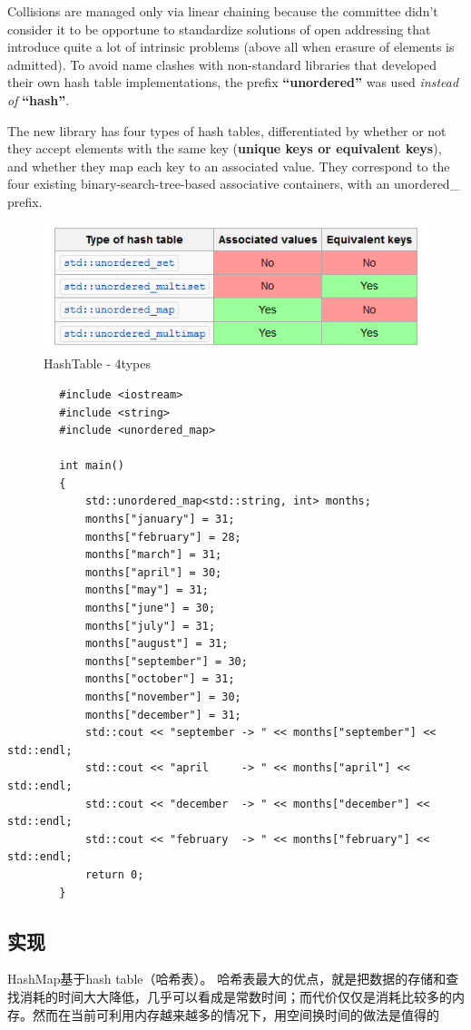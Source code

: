 \documentclass[UTF8,a4paper,12pt]{ctexbook}
\begin{document}
		Collisions are managed only via linear chaining because the committee didn't consider it to be opportune to standardize solutions of open addressing that introduce quite a lot of intrinsic problems (above all when erasure of elements is admitted). To avoid name clashes with non-standard libraries that developed their own hash table implementations, the prefix \textbf{“unordered”} was used \textit{instead of} \textbf{“hash”}.
		
		The new library has four types of hash tables, differentiated by whether or not they accept elements with the same key (\textbf{unique keys or equivalent keys}), and whether they map each key to an associated value. They correspond to the four existing binary-search-tree-based associative containers, with an unordered\_ prefix.
		
		\begin{figure}[h]
			\centering
			\includegraphics[width = 15cm]{Hash_Table.png}
			\caption{HashTable - 4types}
		\end{figure}
		
	\begin{lstlisting}
		#include <iostream>
		#include <string>
		#include <unordered_map>
		
		int main()
		{
			std::unordered_map<std::string, int> months;
			months["january"] = 31;
			months["february"] = 28;
			months["march"] = 31;
			months["april"] = 30;
			months["may"] = 31;
			months["june"] = 30;
			months["july"] = 31;
			months["august"] = 31;
			months["september"] = 30;
			months["october"] = 31;
			months["november"] = 30;
			months["december"] = 31;
			std::cout << "september -> " << months["september"] << std::endl;
			std::cout << "april     -> " << months["april"] << std::endl;
			std::cout << "december  -> " << months["december"] << std::endl;
			std::cout << "february  -> " << months["february"] << std::endl;
			return 0;
		}
	\end{lstlisting}
	\subsection{实现}
		HashMap基于hash table（哈希表）。 哈希表最大的优点，就是把数据的存储和查找消耗的时间大大降低，几乎可以看成是常数时间；而代价仅仅是消耗比较多的内存。然而在当前可利用内存越来越多的情况下，用空间换时间的做法是值得的 
		
\end{document}
